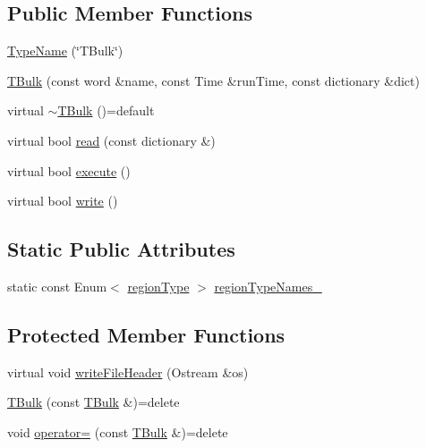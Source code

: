 \subsection*{Public Member Functions}
\begin{DoxyCompactItemize}
\item 
\hyperlink{classFoam_1_1functionObjects_1_1TBulk_a8edbaa51d92b377353b2a376108039d0}{Type\+Name} (\char`\"{}T\+Bulk\char`\"{})
\item 
\hyperlink{classFoam_1_1functionObjects_1_1TBulk_a6bb20b4a8846f463feb853cb44959e4a}{T\+Bulk} (const word \&name, const Time \&run\+Time, const dictionary \&dict)
\item 
virtual \hyperlink{classFoam_1_1functionObjects_1_1TBulk_a3f50101bb3fc0af885c49a62ceafeade}{$\sim$\+T\+Bulk} ()=default
\item 
virtual bool \hyperlink{classFoam_1_1functionObjects_1_1TBulk_afac0600fef97b05534a595ce00b272ed}{read} (const dictionary \&)
\item 
virtual bool \hyperlink{classFoam_1_1functionObjects_1_1TBulk_ae006844a02161d12182ab372ca5c257b}{execute} ()
\item 
virtual bool \hyperlink{classFoam_1_1functionObjects_1_1TBulk_ae8f6374e29a250261b3979bbd6e5cb40}{write} ()
\end{DoxyCompactItemize}
\subsection*{Static Public Attributes}
\begin{DoxyCompactItemize}
\item 
static const Enum$<$ \hyperlink{classFoam_1_1functionObjects_1_1TBulk_a2c25b4a3d851e2d45d7a435a73598323}{region\+Type} $>$ \hyperlink{classFoam_1_1functionObjects_1_1TBulk_a6d04c0598a5ba8ac78f7670ef3a8712a}{region\+Type\+Names\+\_\+}
\end{DoxyCompactItemize}
\subsection*{Protected Member Functions}
\begin{DoxyCompactItemize}
\item 
virtual void \hyperlink{classFoam_1_1functionObjects_1_1TBulk_ad0c7a238f021a605e38a115efbb20aa3}{write\+File\+Header} (Ostream \&os)
\item 
\hyperlink{classFoam_1_1functionObjects_1_1TBulk_af7fb0d621fea3823964931cf85334ea7}{T\+Bulk} (const \hyperlink{classFoam_1_1functionObjects_1_1TBulk}{T\+Bulk} \&)=delete
\item 
void \hyperlink{classFoam_1_1functionObjects_1_1TBulk_a282e2f0ca7b518cc65cd4083223b7692}{operator=} (const \hyperlink{classFoam_1_1functionObjects_1_1TBulk}{T\+Bulk} \&)=delete
\end{DoxyCompactItemize}
